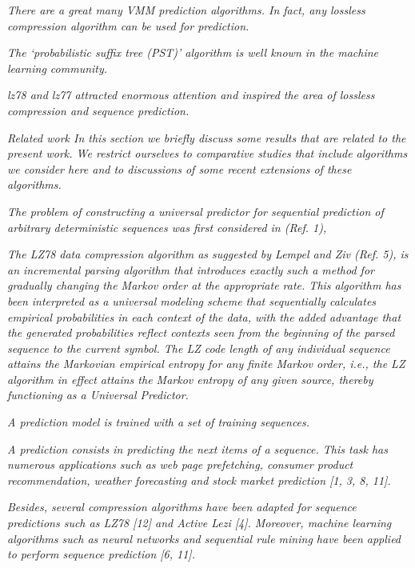 



\emph{There are a great many VMM prediction algorithms. In fact, any lossless compression algorithm can be used for prediction.}~\cite{Begleiter2004} 

\emph{ The ‘probabilistic suffix tree (PST)’ algorithm is well known in the machine learning community.}~\cite{Begleiter2004} 

\emph{lz78 and lz77 attracted enormous attention and inspired the area of lossless compression and sequence prediction.}~\cite{Begleiter2004} 


\emph{Related work
In this section we briefly discuss some results that are related to the present work. We restrict ourselves to comparative studies that include algorithms we consider here and to discussions of some recent extensions of these algorithms.}~\cite{Begleiter2004}

\emph{The problem of constructing a universal predictor for sequential prediction of arbitrary deterministic sequences was first considered in (Ref. 1),}~\cite{Gopalratnam2007}


\emph{The LZ78 data compression algorithm as suggested by Lempel and Ziv (Ref. 5), is an incremental parsing algorithm that introduces exactly such a method for gradually changing the Markov order at the appropriate rate. This algorithm has been interpreted as a universal modeling scheme that sequentially calculates empirical probabilities in each context of the data, with the added advantage that the generated probabilities reflect contexts seen from the beginning of the parsed sequence to the current symbol. The LZ code length of any individual sequence attains the Markovian empirical entropy for any finite Markov order, i.e., the LZ algorithm in effect attains the Markov entropy of any given source, thereby functioning as a Universal Predictor.}~\cite{Gopalratnam2007}


\emph{A prediction model is trained with a set of training sequences.}~\cite{Gueniche2015}

\emph{A prediction consists in predicting the next items of a sequence. This task has numerous applications such as web page prefetching, consumer product recommendation, weather forecasting and stock market prediction [1, 3, 8, 11].}~\cite{Gueniche2015}


\emph{Besides, several compression algorithms have been adapted for sequence predictions such as LZ78 [12] and Active Lezi [4]. Moreover, machine learning algorithms such as neural networks and sequential rule mining have been applied to perform sequence prediction [6, 11].}~\cite{Gueniche2015}


